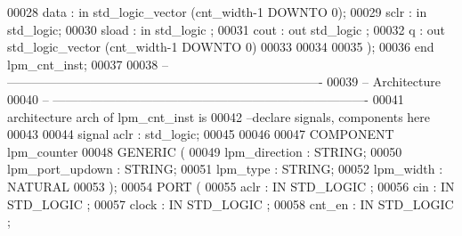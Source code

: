 \begin{DoxyCode}
00028         \textcolor{vhdlchar}{data}        \textcolor{vhdlchar}{:} \textcolor{keywordflow}{in} \textcolor{comment}{std\_logic\_vector} \textcolor{vhdlchar}{(}\textcolor{vhdlchar}{cnt_width}\textcolor{vhdlchar}{-}\textcolor{vhdllogic}{}\textcolor{vhdllogic}{1} \textcolor{keywordflow}{DOWNTO} \textcolor{vhdllogic}{}\textcolor{vhdllogic}{0}\textcolor{vhdlchar}{)};
00029       \textcolor{vhdlchar}{sclr}     \textcolor{vhdlchar}{:} \textcolor{keywordflow}{in} \textcolor{comment}{std\_logic};
00030         \textcolor{vhdlchar}{sload}       \textcolor{vhdlchar}{:} \textcolor{keywordflow}{in} \textcolor{comment}{std\_logic} ;
00031         \textcolor{vhdlchar}{cout}        \textcolor{vhdlchar}{:} \textcolor{keywordflow}{out} \textcolor{comment}{std\_logic} ;
00032         \textcolor{vhdlchar}{q}          \textcolor{vhdlchar}{:} \textcolor{keywordflow}{out} \textcolor{comment}{std\_logic\_vector} \textcolor{vhdlchar}{(}\textcolor{vhdlchar}{cnt_width}\textcolor{vhdlchar}{-}\textcolor{vhdllogic}{}\textcolor{vhdllogic}{1} \textcolor{keywordflow}{DOWNTO} \textcolor{vhdllogic}{}\textcolor{vhdllogic}{0}\textcolor{vhdlchar}{)}
00033 
00034 
00035         \textcolor{vhdlchar}{)};
00036 \textcolor{keywordflow}{end} \textcolor{vhdlchar}{lpm\_cnt\_inst};
00037 
00038 \textcolor{keyword}{-- ----------------------------------------------------------------------------}
00039 \textcolor{keyword}{-- Architecture}
00040 \textcolor{keyword}{-- ----------------------------------------------------------------------------}
00041 \textcolor{keywordflow}{architecture} arch \textcolor{keywordflow}{of} lpm_cnt_inst is
00042 \textcolor{keyword}{--declare signals,  components here}
00043 
00044 \textcolor{keywordflow}{signal} \textcolor{vhdlchar}{aclr} \textcolor{vhdlchar}{:} \textcolor{comment}{std\_logic};
00045 
00046 
00047     \textcolor{keywordflow}{COMPONENT} lpm\_counter
00048     \textcolor{keywordflow}{GENERIC} (
00049         lpm\_direction          : \textcolor{comment}{STRING};
00050         lpm\_port\_updown     : \textcolor{comment}{STRING};
00051         lpm\_type                 : \textcolor{comment}{STRING};
00052         lpm\_width             : \textcolor{comment}{NATURAL}
00053     );
00054     \textcolor{keywordflow}{PORT} (
00055             aclr          : \textcolor{keywordflow}{IN} \textcolor{comment}{STD\_LOGIC} ;
00056             cin       : \textcolor{keywordflow}{IN} \textcolor{comment}{STD\_LOGIC} ;
00057             clock         : \textcolor{keywordflow}{IN} \textcolor{comment}{STD\_LOGIC} ;
00058             cnt\_en     : \textcolor{keywordflow}{IN} \textcolor{comment}{STD\_LOGIC} ;

\end{DoxyCode}
